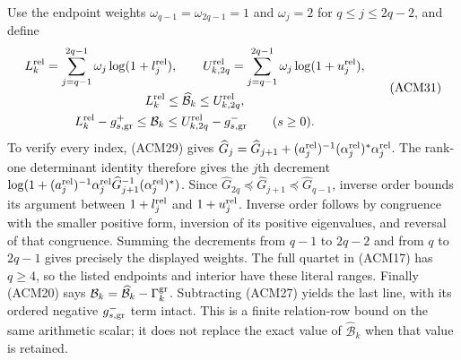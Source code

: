 Use the endpoint weights $\omega_{q-1}=\omega_{2q-1}=1$ and
$\omega_j=2$ for $q\leq j\leq2q-2$, and define
\[
\begin{gathered}
 L_k^{\rm rel}=\sum_{j=q-1}^{2q-1}\omega_j\log(1+l_j^{\rm rel}),
 \qquad
 U_{k,2q}^{\rm rel}=\sum_{j=q-1}^{2q-1}\omega_j\log(1+u_j^{\rm rel}),\\
 L_k^{\rm rel}\leq\widehat{\mathcal B}_k
                                  \leq U_{k,2q}^{\rm rel},\\
 L_k^{\rm rel}-g_{s,\rm gr}^{+}\leq\mathcal B_k
                       \leq U_{k,2q}^{\rm rel}-g_{s,\rm gr}^{-}
 \qquad(s\geq0).
\end{gathered}\tag{ACM31}
\]
To verify every index, (ACM29) gives
$\widehat G_j=\widehat G_{j+1}
 +(a_j^{\rm rel})^{-1}(\alpha_j^{\rm rel})^*\alpha_j^{\rm rel}$.
The rank-one determinant identity therefore gives the $j$th
decrement $\log(1+(a_j^{\rm rel})^{-1}\alpha_j^{\rm rel}
\widehat G_{j+1}^{-1}(\alpha_j^{\rm rel})^*)$.
Since $\widehat G_{2q}\preceq\widehat G_{j+1}
\preceq\widehat G_{q-1}$, inverse order bounds its argument
between $1+l_j^{\rm rel}$ and $1+u_j^{\rm rel}$.
Inverse order follows by congruence with the smaller positive
form, inversion of its positive eigenvalues, and reversal of
that congruence. Summing the decrements from $q-1$ to $2q-2$
and from $q$ to $2q-1$ gives precisely the displayed weights.
The full quartet in (ACM17) has $q\geq4$, so the listed endpoints
and interior have these literal ranges. Finally (ACM20) says
$\mathcal B_k=\widehat{\mathcal B}_k-\Gamma_k^{\rm gr}$.
Subtracting (ACM27) yields the last line, with its ordered negative
$g_{s,\rm gr}^{-}$ term intact. This is a finite relation-row
bound on the same arithmetic scalar; it does not replace the
exact value of $\widehat{\mathcal B}_k$ when that value is retained.


